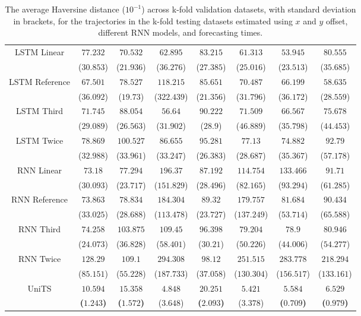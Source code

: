 \begin{table}[!ht]
{\begin{tabular}{|c|c|c|c|c|c|c|c|}
			\multirow{2}{*}{LSTM Linear} & $77.232$ & $70.532$ & $62.895$ & $83.215$ & $61.313$ & $53.945$ & $80.555$ \\
			 & ($30.853$) & ($21.936$) & ($36.276$) & ($27.385$) & ($25.016$) & ($23.513$) & ($35.685$) \\ \hline
			\multirow{2}{*}{LSTM Reference} & $67.501$ & $78.527$ & $118.215$ & $85.651$ & $70.487$ & $66.199$ & $58.635$ \\
			 & ($36.092$) & ($19.73$) & ($322.439$) & ($21.356$) & ($31.796$) & ($36.172$) & ($28.559$) \\ \hline
			\multirow{2}{*}{LSTM Third} & $71.745$ & $88.054$ & $56.64$ & $90.222$ & $71.509$ & $66.567$ & $75.678$ \\
			 & ($29.089$) & ($26.563$) & ($31.902$) & ($28.9$) & ($46.889$) & ($35.798$) & ($44.453$) \\ \hline
			\multirow{2}{*}{LSTM Twice} & $78.869$ & $100.527$ & $86.655$ & $95.281$ & $77.13$ & $74.882$ & $92.79$ \\
			 & ($32.988$) & ($33.961$) & ($33.247$) & ($26.383$) & ($28.687$) & ($35.367$) & ($57.178$) \\ \hline
			\multirow{2}{*}{RNN Linear} & $73.18$ & $77.294$ & $196.37$ & $87.192$ & $114.754$ & $133.466$ & $91.71$ \\
			 & ($30.093$) & ($23.717$) & ($151.829$) & ($28.496$) & ($82.165$) & ($93.294$) & ($61.285$) \\ \hline
			\multirow{2}{*}{RNN Reference} & $73.863$ & $78.834$ & $184.304$ & $89.32$ & $179.757$ & $81.684$ & $90.434$ \\
			 & ($33.025$) & ($28.688$) & ($113.478$) & ($23.727$) & ($137.249$) & ($53.714$) & ($65.588$) \\ \hline
			\multirow{2}{*}{RNN Third} & $74.258$ & $103.875$ & $109.45$ & $96.398$ & $79.204$ & $78.9$ & $80.946$ \\
			 & ($24.073$) & ($36.828$) & ($58.401$) & ($30.21$) & ($50.226$) & ($44.006$) & ($54.277$) \\ \hline
			\multirow{2}{*}{RNN Twice} & $128.29$ & $109.1$ & $294.308$ & $98.12$ & $251.515$ & $283.778$ & $218.294$ \\
			 & ($85.151$) & ($55.228$) & ($187.733$) & ($37.058$) & ($130.304$) & ($156.517$) & ($133.161$) \\ \hline
			\multirow{2}{*}{UniTS} & $\mathbf{10.594}$ & $\mathbf{15.358}$ & $4.848$ & $\mathbf{20.251}$ & $5.421$ & $\mathbf{5.584}$ & $\mathbf{6.529}$ \\
			 & \textbf{(}$\mathbf{1.243}$\textbf{)} & \textbf{(}$\mathbf{1.572}$\textbf{)} & ($3.648$) & \textbf{(}$\mathbf{2.093}$\textbf{)} & ($3.378$) & \textbf{(}$\mathbf{0.709}$\textbf{)} & \textbf{(}$\mathbf{0.979}$\textbf{)} \\ \hline
		\end{tabular}
	}
	\caption{The average Haversine distance ($10^{-1}$) across k-fold validation datasets, with standard deviation in brackets, for the trajectories in the k-fold testing datasets estimated using $x$ and $y$ offset, different RNN models, and forecasting times.}
	\label{tab:all_no_abs_haversine}
\end{table}